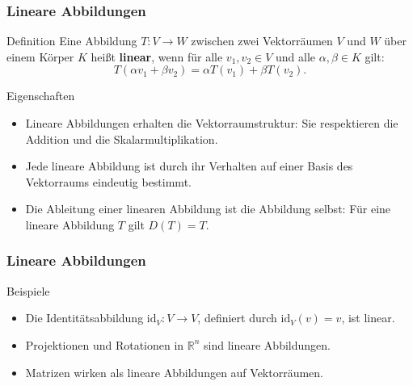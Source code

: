 \documentclass{beamer}
\begin{document}
    \begin{frame}
        \frametitle{Lineare Abbildungen}
    
        \begin{block}{Definition}
            Eine Abbildung \( T: V \to W \) zwischen zwei Vektorräumen \( V \) und \( W \) über einem Körper \( K \) heißt \textbf{linear}, wenn für alle \( v_1, v_2 \in V \) und alle \( \alpha, \beta \in K \) gilt:
            \[
            T(\alpha v_1 + \beta v_2) = \alpha T(v_1) + \beta T(v_2).
            \]
        \end{block}
    
        \begin{block}{Eigenschaften}
            \begin{itemize}
                \item Lineare Abbildungen erhalten die Vektorraumstruktur: Sie respektieren die Addition und die Skalarmultiplikation.
                \item Jede lineare Abbildung ist durch ihr Verhalten auf einer Basis des Vektorraums eindeutig bestimmt.
                \item Die Ableitung einer linearen Abbildung ist die Abbildung selbst: Für eine lineare Abbildung \( T \) gilt \( D(T) = T \).
            \end{itemize}
        \end{block}
    
  
        
    \end{frame}
    
    \begin{frame}
        \frametitle{Lineare Abbildungen}
    
    
        \begin{block}{Beispiele}
            \begin{itemize}
                \item Die Identitätsabbildung \( \text{id}_V: V \to V \), definiert durch \( \text{id}_V(v) = v \), ist linear.
                \item Projektionen und Rotationen in \( \mathbb{R}^n \) sind lineare Abbildungen.
                \item Matrizen wirken als lineare Abbildungen auf Vektorräumen.
            \end{itemize}
        \end{block}
        
    \end{frame}
    
\end{document}
